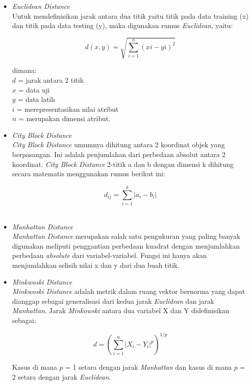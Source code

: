 \documentclass[conference]{IEEEtran}
\begin{document}
\begin{itemize}
\item \emph{Euclidean Distance}\\
Untuk mendefinisikan jarak antara dua titik yaitu titik pada data training (x) dan titik pada data testing (y), maka digunakan rumus \emph{Euclidean}\cite{nurhadi2017aplikasi}, yaitu:

\begin{equation}
d(x,y)=\sqrt{\sum^{n}_{i=1} (xi-yi)^2}
\label{eq1}
\end{equation}

dimana:\\
$d$ = jarak antara 2 titik\\
$x$ = data uji\\
$y$ = data latih\\
$i$ = merepresentasikan nilai atribut\\
$n$ = merupakan dimensi atribut.\\

\item \emph{City Block Distance}\\
\emph{City Block Distance} umumnya dihitung antara 2 koordinat objek yang berpasangan. Ini adalah penjumlahan dari perbedaan absolut antara 2 koordinat. \emph{City Block Distance} 2-titik a dan b dengan dimensi k dihitung secara matematis menggunakan rumus berikut ini:

\begin{equation}
d_{ij}=\sum^{k}_{i=1} | a_i-b_i |
\label{eq2}
\end{equation}\\

\item \emph{Manhattan Distance}\\
\emph{Manhattan Distance} merupakan salah satu pengukuran yang paling banyak digunakan meliputi penggantian perbedaan kuadrat dengan menjumlahkan perbedaan \emph{absolute} dari variabel-variabel. Fungsi ini hanya akan menjumlahkan selisih nilai x dan y dari dua buah titik.\\

\item \emph{Minkwoski Distance}\\
\emph{Minkwoski Distance} adalah metrik dalam ruang vektor bernorma yang dapat dianggap sebagai generalisasi dari kedua jarak \emph{Euclidean} dan jarak \emph{Manhattan}. Jarak \emph{Minkowski} antara dua variabel X dan Y didefinisikan sebagai:

\begin{equation}
d = (\sum^{n}_{i=1} | X_i-Y_i |^p)^{1/p}
\label{eq3}
\end{equation}

Kasus di mana $p$ = 1 setara dengan jarak \emph{Manhattan} dan kasus di mana $p$ = 2 setara dengan jarak \emph{Euclidean}.

\end{itemize}
\end{document}
